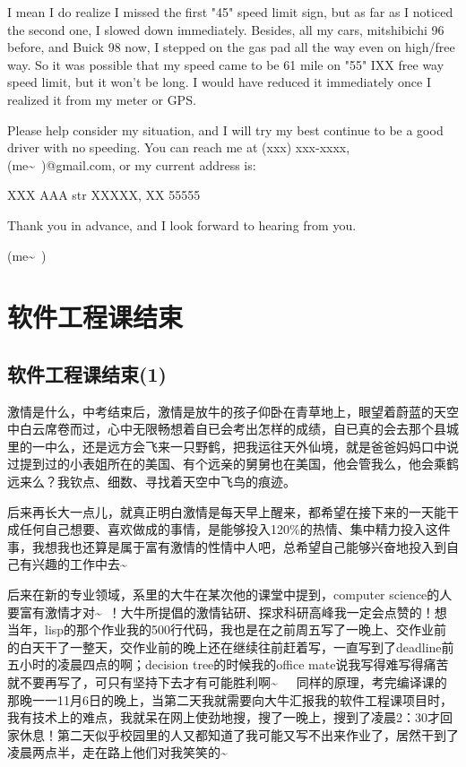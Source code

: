 \documentclass[12pt]{book}
\begin{document}
I mean I do realize I missed the first "45" speed limit sign, but as far as I noticed the second one, I slowed down immediately. Besides, all my cars, mitshibichi 96 before, and Buick 98 now, I stepped on the gas pad all the way even on high/free way. So it was possible that my speed came to be 61 mile on "55" IXX free way speed limit, but it won't be long. I would have reduced it immediately once I realized it from my meter or GPS. 

Please help consider my situation, and I will try my best continue to be a good driver with no speeding. You can reach me at (xxx) xxx-xxxx, (me\textasciitilde{}~)@gmail.com, or my current address is: 

XXX AAA str
XXXXX, XX 55555

Thank you in advance, and I look forward to hearing from you. 

(me\textasciitilde{}~)
\chapter{软件工程课结束}
\label{sec-32}
\section{软件工程课结束(1)}
\label{sec-32-1}

激情是什么，中考结束后，激情是放牛的孩子仰卧在青草地上，眼望着蔚蓝的天空中白云席卷而过，心中无限畅想着自已会考出怎样的成绩，自已真的会去那个县城里的一中么，还是远方会飞来一只野鹤，把我运往天外仙境，就是爸爸妈妈口中说过提到过的小表姐所在的美国、有个远亲的舅舅也在美国，他会管我么，他会乘鹤远来么？我钦点、细数、寻找着天空中飞鸟的痕迹。

后来再长大一点儿，就真正明白激情是每天早上醒来，都希望在接下来的一天能干成任何自己想要、喜欢做成的事情，是能够投入120\%的热情、集中精力投入这件事，我想我也还算是属于富有激情的性情中人吧，总希望自己能够兴奋地投入到自己有兴趣的工作中去\textasciitilde{}~

后来在新的专业领域，系里的大牛在某次他的课堂中提到，computer science的人要富有激情才对\textasciitilde{}~！大牛所提倡的激情钻研、探求科研高峰我一定会点赞的！想当年，lisp的那个作业我的500行代码，我也是在之前周五写了一晚上、交作业前的白天干了一整天，交作业前的晚上还在继续往前赶着写，一直写到了deadline前五小时的凌晨四点的啊；decision tree的时候我的office mate说我写得难写得痛苦就不要再写了，可只有坚持下去才有可能胜利啊\textasciitilde{}~　同样的原理，考完编译课的那晚一一11月6日的晚上，当第二天我就需要向大牛汇报我的软件工程课项目时，我有技术上的难点，我就呆在网上使劲地搜，搜了一晚上，搜到了凌晨2：30才回家休息！第二天似乎校园里的人又都知道了我可能又写不出来作业了，居然干到了凌晨两点半，走在路上他们对我笑笑的\textasciitilde{}~
\end{document}
